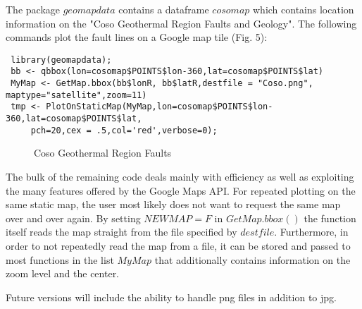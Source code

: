 \documentclass{article}
\begin{document}
\noindent The package $geomapdata$ contains a dataframe $cosomap$ which contains location information on the "Coso Geothermal Region Faults and Geology".
The following commands plot the fault lines on a Google map tile (Fig. 5):
\begin{verbatim}
 library(geomapdata);
 bb <- qbbox(lon=cosomap$POINTS$lon-360,lat=cosomap$POINTS$lat)
 MyMap <- GetMap.bbox(bb$lonR, bb$latR,destfile = "Coso.png", maptype="satellite",zoom=11)
 tmp <- PlotOnStaticMap(MyMap,lon=cosomap$POINTS$lon-360,lat=cosomap$POINTS$lat, 
     pch=20,cex = .5,col='red',verbose=0);
\end{verbatim}

\begin{figure}[thb]
\centering
    \caption{Coso Geothermal Region Faults}
\end{figure}


\noindent The bulk of the remaining code deals mainly with efficiency as well as exploiting the many features offered by the Google Maps API.
For repeated plotting on the same static map, the user most likely does not want to request the same map over and over again. 
By setting $NEWMAP = F$ in $GetMap.bbox()$ the function itself reads the map straight from the file specified by $destfile$.
Furthermore, in order to not repeatedly read the map from a file, it can be stored and passed to most functions in the list $MyMap$ that additionally contains information on the zoom level and the center.

Future versions will include the ability to handle png files in addition to jpg.
\end{document}
